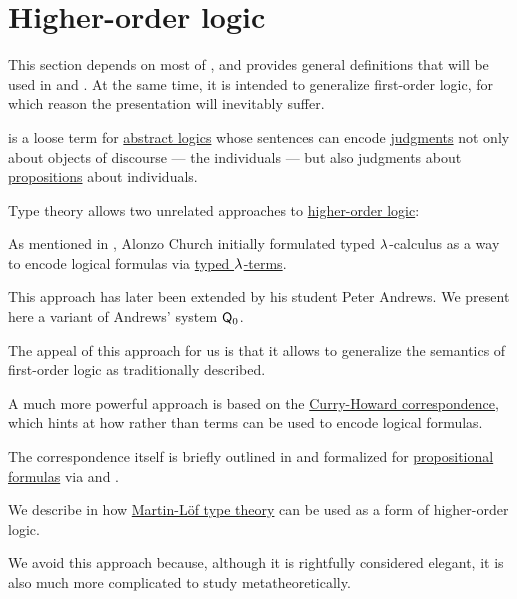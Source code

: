 \section{Higher-order logic}\label{sec:higher_order_logic}

This section depends on most of , and provides general definitions that will be used in  and . At the same time, it is intended to generalize first-order logic, for which reason the presentation will inevitably suffer.

\begin{concept}\label{con:higher_order_logic}
   is a loose term for \hyperref[def:abstract_logic]{abstract logics} whose sentences can encode \hyperref[con:judgment]{judgments} not only about objects of discourse --- the individuals --- but also judgments about \hyperref[con:proposition]{propositions} about individuals.
\end{concept}

\begin{remark}\label{rem:higher_order_logic_and_type_theory}
  Type theory allows two unrelated approaches to \hyperref[con:higher_order_logic]{higher-order logic}:
  \begin{thmenum}
     As mentioned in , Alonzo Church initially formulated typed \( {\mathrm \lambda} \)-calculus as a way to encode logical formulas via \hyperref[def:typed_lambda_term]{typed \( {\mathrm \lambda} \)-terms}.

    This approach has later been extended by his student Peter Andrews. We present here a variant of Andrews' system \( \textsf{Q}_0 \).

    The appeal of this approach for us is that it allows to generalize the semantics of first-order logic as traditionally described.

     A much more powerful approach is based on the \hyperref[con:curry_howard_correspondence]{Curry-Howard correspondence}, which hints at how  rather than terms can be used to encode logical formulas.

    The correspondence itself is briefly outlined in  and formalized for \hyperref[def:propositional_syntax/formula]{propositional formulas} via  and .

    We describe in  how \hyperref[def:mltt]{Martin-L\"of type theory} can be used as a form of higher-order logic.

    We avoid this approach because, although it is rightfully considered elegant, it is also much more complicated to study metatheoretically.
  \end{thmenum}
\end{remark}

